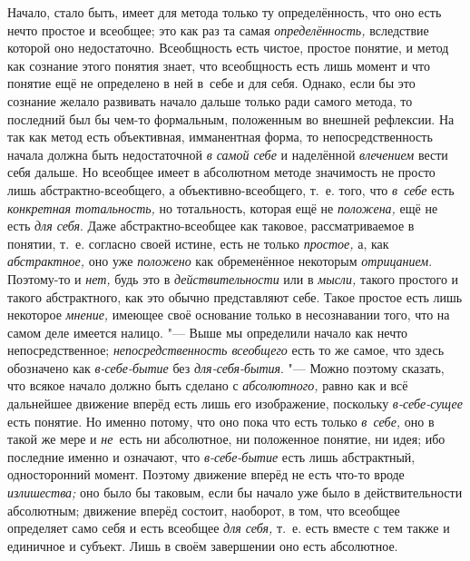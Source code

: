 Начало, стало быть, имеет для метода только ту определённость, что оно
есть нечто простое и всеобщее; это как раз та самая {\em определённость,}
вследствие которой оно недостаточно. Всеобщность есть чистое,
простое понятие, и метод как сознание этого понятия знает, что всеобщность
есть лишь момент и что понятие ещё не определено в ней в~себе и для себя.
Однако, если бы это сознание желало развивать начало дальше только ради
самого метода, то последний был бы чем-то формальным, положенным во внешней
рефлексии. На так как метод есть объективная, имманентная форма, то
непосредственность начала должна быть недостаточной
{\em в самой себе} и наделённой {\em влечением}
вести себя дальше. Но всеобщее имеет в абсолютном методе
значимость не просто лишь абстрактно-всеобщего, а объективно-всеобщего,
т.~е. того, что {\em в~себе} есть {\em конкретная
тотальность,} но тотальность, которая ещё не
{\em положена,} ещё не есть {\em для себя}. Даже
абстрактно-всеобщее как таковое, рассматриваемое в понятии, т.~е. согласно
своей истине, есть не только {\em простое,} а, как {\em абстрактное,} оно
уже {\em положено} как обременённое некоторым {\em отрицанием}.
Поэтому-то и {\em нет,} будь это в {\em действительности} или в {\em мысли,}
такого простого и такого абстрактного, как это обычно
представляют себе. Такое простое есть лишь некоторое {\em мнение,} имеющее
своё основание только в несознавании того, что на самом деле имеется
налицо. "--- Выше мы определили начало как нечто непосредственное;
{\em непосредственность всеобщего}
есть то же самое, что здесь обозначено как
{\em в-себе-бытие} без {\em для-себя-бытия}. "--- Можно поэтому
сказать, что всякое начало должно быть сделано с {\em абсолютного,}
равно как и всё дальнейшее движение вперёд есть лишь его
изображение, поскольку {\em в-себе-сущее} есть
понятие. Но именно потому, что оно пока что есть только
{\em в~себе,} оно в такой же мере и {\em не}~есть
ни абсолютное, ни положенное понятие, ни идея; ибо последние именно и
означают, что {\em в-себе-бытие}
есть лишь абстрактный, односторонний момент. Поэтому движение
вперёд не есть что-то вроде {\em излишества;} оно
было бы таковым, если бы начало уже было в действительности абсолютным;
движение вперёд состоит, наоборот, в том, что всеобщее определяет само себя
и есть всеобщее {\em для себя,}
т.~е. есть вместе с тем также и единичное и субъект. Лишь в
своём завершении оно есть абсолютное.

